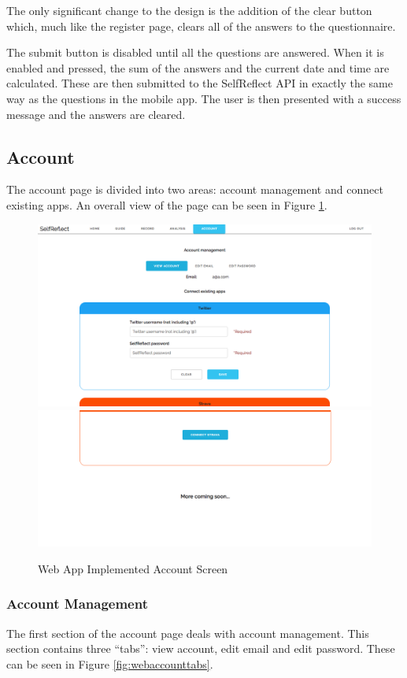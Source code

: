 \documentclass[11pt,openright,a4paper]{report}
\begin{document}
\newpage
The only significant change to the design is the addition of the clear button which, much like the register page, clears all of the answers to the questionnaire.

The submit button is disabled until all the questions are answered. When it is enabled and pressed, the sum of the answers and the current date and time are calculated. These are then submitted to the SelfReflect API in exactly the same way as the questions in the mobile app. The user is then presented with a success message and the answers are cleared.

\subsection{Account}
The account page is divided into two areas: account management and connect existing apps. An overall view of the page can be seen in Figure \ref{fig:webaccountimpl}.

\begin{figure}[ht]
\centering
\caption{Web App Implemented Account Screen}
\includegraphics[width=.8\textwidth]{i/webaccountimpltop.png}
\includegraphics[width=.8\textwidth]{i/webaccountimplbottom.png}
\label{fig:webaccountimpl}
\end{figure}

\subsubsection{Account Management}
The first section of the account page deals with account management. This section contains three \enquote{tabs}: view account, edit email and edit password. These can be seen in Figure \ref{fig:webaccounttabs}.
\end{document}
